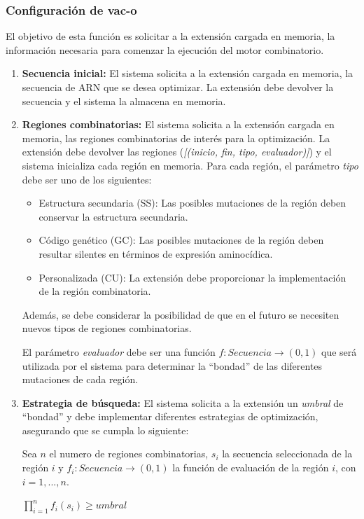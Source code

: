 \documentclass[10pt,a4paper]{article}
\begin{document}
  \subsubsection{Configuraci\'on de vac-o}
  El objetivo de esta funci\'on es solicitar a la extensi\'on cargada en
memoria, la informaci\'on necesaria para comenzar la ejecuci\'on del motor
combinatorio.
  \begin{enumerate}
    \item \textbf{Secuencia inicial:}
    El sistema solicita a la extensi\'on cargada en memoria, la secuencia de ARN
que se desea optimizar. La extensi\'on debe devolver la secuencia y el sistema
la almacena en memoria. 
    
    \item \textbf{Regiones combinatorias:}
    El sistema solicita a la extensi\'on cargada en memoria, las regiones
combinatorias de inter\'es para la optimizaci\'on. La extensi\'on debe devolver
las regiones (\textit{[(inicio, fin, tipo, evaluador)]}) y el sistema inicializa
cada regi\'on en memoria. Para cada regi\'on, el par\'ametro \textit{tipo} debe
ser uno de los siguientes:
    \begin{itemize}
      \item Estructura secundaria (SS): Las posibles mutaciones de la regi\'on
deben conservar la estructura secundaria.
      \item C\'odigo gen\'etico (GC): Las posibles mutaciones de la regi\'on
deben resultar silentes en t\'erminos de expresi\'on aminoc\'idica.
      \item Personalizada (CU): La extensi\'on debe proporcionar la
implementaci\'on de la regi\'on combinatoria.
    \end{itemize}

    Adem\'as, se debe considerar la posibilidad de que en el futuro se necesiten
nuevos tipos de regiones combinatorias.

    El par\'ametro \textit{evaluador} debe ser una funci\'on $f: Secuencia
\rightarrow (0,1)$ que ser\'a utilizada por el sistema para determinar la
``bondad'' de las diferentes mutaciones de cada regi\'on.

    \item \textbf{Estrategia de b\'usqueda:}
    El sistema solicita a la extensi\'on un \textit{umbral} de ``bondad'' y debe
implementar diferentes estrategias de optimizaci\'on, asegurando que se cumpla
lo siguiente:

    Sea $n$ el numero de regiones combinatorias, $s_{i}$ la secuencia
seleccionada de la regi\'on $i$ y $f_{i}: Secuencia \rightarrow (0,1)$ la
funci\'on de evaluaci\'on de la regi\'on $i$, con $i=1, ..., n$.
    \begin{center}
    $\prod_{i=1}^{n} f_{i}(s_{i}) \ge umbral$
    \end{center}


\end{enumerate}
\end{document}
